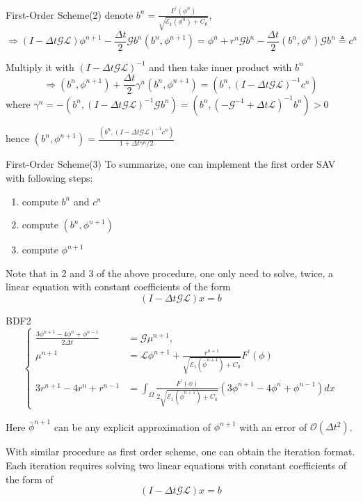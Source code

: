 \documentclass[9pt]{beamer}
\begin{document}
\begin{frame}{First-Order Scheme(2)}
denote $b^n = \frac{F^{\prime}(\phi^n)}{\sqrt{\mathcal{E}_{1}(\phi^{n})+C_0}}$,
$$\Rightarrow
(I-\Delta t \mathcal{G L}) \phi^{n+1}-\frac{\Delta t}{2} \mathcal{G}b^{n}\left(b^{n}, \phi^{n+1}\right)=\phi^{n}+r^{n} \mathcal{G} b^{n}-\frac{\Delta t}{2}\left(b^{n}, \phi^{n}\right) \mathcal{G} b^{n} \triangleq c^n$$

Multiply it with $(I-\Delta t \mathcal{G L})^{-1}$ and then take inner product with $b^n$
$$\Rightarrow
\left(b^{n}, \phi^{n+1}\right)+\frac{\Delta t}{2} \gamma^{n}\left(b^{n}, \phi^{n+1}\right)=\left(b^{n},(I-\Delta t \mathcal{G L})^{-1} c^{n}\right)$$
where $\gamma^{n}=-\left(b^{n},(I-\Delta t \mathcal{G} \mathcal{L})^{-1} \mathcal{G} b^{n}\right)=\left(b^{n},\left(-\mathcal{G}^{-1}+\Delta t \mathcal{L}\right)^{-1} b^{n}\right)>0$

hence
$\left(b^{n}, \phi^{n+1}\right)=\frac{\left(b^{n},(I-\Delta t \mathcal{G L})^{-1} c^{n}\right)}{1+\Delta t \gamma^{n} / 2}$
\end{frame}

\begin{frame}{First-Order Scheme(3)}
To summarize, one can implement the first order SAV with following steps:
\begin{enumerate}
\item{compute $b^n$ and $c^n$}
\item{compute $(b^n,\phi^{n+1})$}
\item{compute $\phi^{n+1}$}
\end{enumerate}
Note that in 2 and 3 of the above procedure, one only need to solve, twice, a linear equation with constant coefficients of the form
$$(I-\Delta t \mathcal{G L}) x = b$$
\end{frame}

\begin{frame}{BDF2}
$$\left\{
\begin{aligned}
 \frac{3 \phi^{n+1}-4 \phi^{n}+\phi^{n-1}}{2 \Delta t} &=\mathcal{G} \mu^{n+1}, \\ \mu^{n+1} &=\mathcal{L} \phi^{n+1}+\frac{r^{n+1}}{\sqrt{\mathcal{E}_{1}(\bar{\phi}^{n+1})+C_0}} F^{\prime}(\phi) \\ 3 r^{n+1}-4 r^{n}+r^{n-1} &=\int_{\Omega} \frac{F^{\prime}(\phi)}{2 \sqrt{\mathcal{E}_{1}(\bar{\phi}^{n+1})+C_0}}\left(3 \phi^{n+1}-4 \phi^{n}+\phi^{n-1}\right) dx
 \end{aligned}
\right.$$

Here $\bar{\phi}^{n+1}$ can be any explicit approximation of $\phi^{n+1}$ with an error of $\mathcal O(\Delta t^2)$.

With similar procedure as first order scheme, one can obtain the iteration format. Each iteration requires solving two linear equations with constant coefficients of the form of $$(I-\Delta t \mathcal{G L}) x = b$$

\end{frame}
\end{document}
